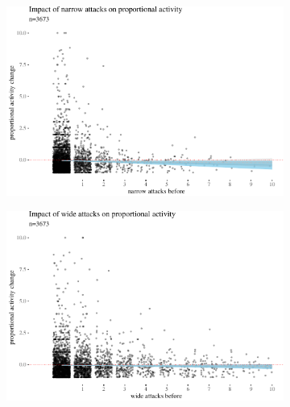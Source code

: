 \documentclass[10pt,]{scrartcl}
\begin{document}
\begin{figure}
\begin{subfigure}[b]{0.75\textwidth}

\begin{center}\includegraphics[width=1\linewidth]{redditAnalysisWalkthrough_files/figure-latex/propPlotHigh-1} \end{center}
\end{subfigure}
 
 \vspace{3mm}
\begin{subfigure}[b]{0.75\textwidth}

\begin{center}\includegraphics[width=1\linewidth]{redditAnalysisWalkthrough_files/figure-latex/unnamed-chunk-17-1} \end{center}
\end{subfigure}



\end{figure}
\end{document}
